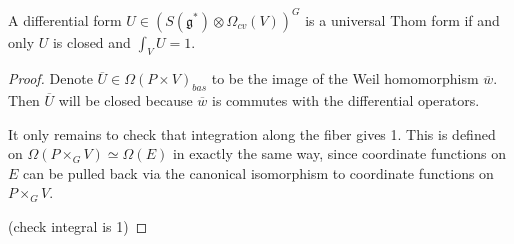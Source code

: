 \begin{prop} 
	A differential form $U\in (S(\mathfrak{g}^*)\otimes \Omega_{cv}(V))^G$ is a 
	universal Thom form if and only $U$ is closed and  $\int_V U = 1$.
\end{prop}
\begin{proof}
	Denote $\overline{U}\in \Omega(P\times V)_{bas}$ to be the image of the
	Weil homomorphism $\overline{w}$. Then $\overline{U}$ will be closed because
	$\overline{w}$ is commutes with the differential operators. 

	It only remains to check that integration along the fiber gives 1. 
	This is defined on $\Omega(P\times_G V)\simeq \Omega(E)$ in exactly the same
	way, since coordinate functions on $E$ can be pulled back via the canonical
	isomorphism to coordinate functions on $P\times_G V$. 
	\begin{comment}
	Recall that a local trivialisation 
	$\phi_\alpha : E|_{U_\alpha} \to U_\alpha \times
	\mathbb{R}^n$ gives coordinate functions $[t_1\cdots t_n] = p_2\phi_\alpha
	\in \mathbb{R}^n$ where $p_2$ is the projection on to $\mathbb{R}^n$.  
	This can be identified with coordinate functions on the associated bundle
	$[x_1\cdots]$
	\end{comment}
	(check integral is 1)
\end{proof}

